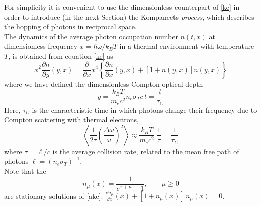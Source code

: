 \documentclass[a4paper,12pt,reqno,superscriptaddress,nofootinbib]{revtex4}
\theoremstyle{plain}
\theoremstyle{definition}
\theoremstyle{remark}
\newcommand{\0}{^{(0)}}
\newcommand{\1}{^{(1)}}
\newcommand{\2}{^{(2)}}
\begin{document}
For simplicity it is convenient to use the dimensionless counterpart of \eqref{ke} in order to introduce (in the next Section) the Kompaneets {\it process}, which describes the hopping of photons in reciprocal space.\\ 
The dynamics of the average photon occupation number $n(t, x)$ at dimensionless frequency $x= \hbar \omega/k_B T$ in a thermal environment with temperature $T$, is obtained from equation \eqref{ke} as
\begin{equation}\label{ake}
x^2\frac{\partial n}{\partial y}(y,x) = \frac{\partial }{\partial x}x^4\left\{
\frac{\partial n}{\partial x}(y,x) + 
\left[1+n(y,x)\right]n(y,x)\right\}
\end{equation}
where we have defined the dimensionless Compton optical depth
\[y = \frac{ k_B T }{m_e c^2} n_e \sigma_T c \, t =  \frac{ t}{\tau_C}\]
Here, $\tau_C$ is the  characteristic time in which photons change their frequency due to Compton scattering with thermal electrons,
\begin{equation}\label{shift}
\left\langle\frac{1}{2\tau}\left(\frac{\Delta\omega}{\omega}\right)^2\right\rangle\approx \frac{ k_B T }{m_e c^2}\; \frac 1{\tau}= \frac{1}{\tau_C}
\end{equation}
where $\tau = \ell/c$ is the average collision rate, related 
to the mean free path of photons $\ell=(n_e\sigma_T)^{-1}$.\\
Note that the
\begin{equation}\label{cc}
n_\mu(x) = \frac 1{e^{x+\mu}-1}, \qquad \mu\geq 0
\end{equation}
are stationary solutions of \eqref{ake}: $\frac{\dd n_\mu}{\dd x}(x) + [ 
1+n_\mu(x) ] \,n_\mu(x)=0$.\\
\end{document}
